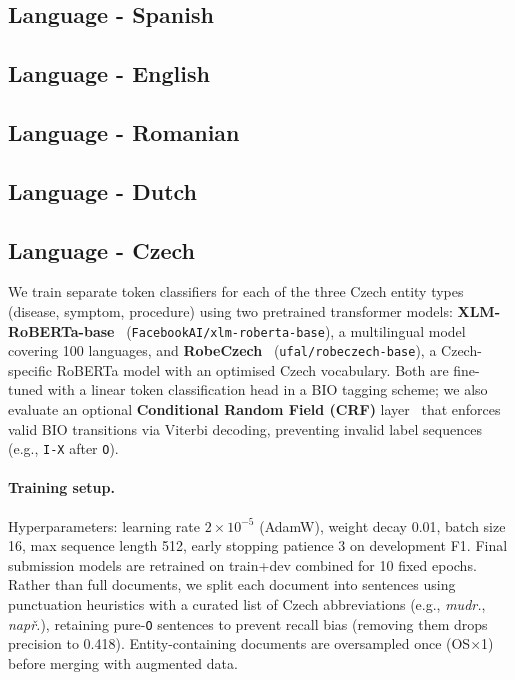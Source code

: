 \documentclass[11pt]{article}
\begin{document}
\subsection{Language - Spanish}

\subsection{Language - English}

\subsection{Language - Romanian}

\subsection{Language - Dutch}

\subsection{Language - Czech}

\label{sec:methods-cz}
We train separate token classifiers for each of the three Czech entity types (disease,
symptom, procedure) using two pretrained transformer models:
\textbf{XLM-RoBERTa-base}~\cite{conneau-etal-2020-unsupervised} (\texttt{FacebookAI/xlm-roberta-base}),
a multilingual model covering 100 languages, and
\textbf{RobeCzech}~\cite{straka-strakova-2020-robeczech} (\texttt{ufal/robeczech-base}),
a Czech-specific RoBERTa model with an optimised Czech vocabulary.
Both are fine-tuned with a linear token classification head in a BIO tagging scheme;
we also evaluate an optional \textbf{Conditional Random Field (CRF)}
layer~\cite{lafferty2001conditional} that enforces valid BIO transitions via Viterbi
decoding, preventing invalid label sequences (e.g., \texttt{I-X} after \texttt{O}).

\paragraph{Training setup.}
Hyperparameters: learning rate $2{\times}10^{-5}$ (AdamW), weight decay 0.01, batch
size 16, max sequence length 512, early stopping patience 3 on development F1.
Final submission models are retrained on train+dev combined for 10 fixed epochs.
Rather than full documents, we split each document into sentences using punctuation
heuristics with a curated list of Czech abbreviations (e.g., \textit{mudr.},
\textit{např.}), retaining pure-\texttt{O} sentences to prevent recall bias (removing
them drops precision to 0.418). Entity-containing documents are oversampled once
(OS$\times$1) before merging with augmented data.
\end{document}
